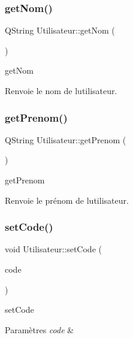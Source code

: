 \subsubsection{\texorpdfstring{get\+Nom()}{getNom()}}
{\footnotesize\ttfamily Q\+String Utilisateur\+::get\+Nom (\begin{DoxyParamCaption}{ }\end{DoxyParamCaption})}



get\+Nom 

\begin{DoxyReturn}{Renvoie}
le nom de l\textquotesingle{}utilisateur. 
\end{DoxyReturn}
\mbox{\label{class_utilisateur_a6b4d6fa5c9b5c8565c2f2d1f68df9bf3}} 
\subsubsection{\texorpdfstring{get\+Prenom()}{getPrenom()}}
{\footnotesize\ttfamily Q\+String Utilisateur\+::get\+Prenom (\begin{DoxyParamCaption}{ }\end{DoxyParamCaption})}



get\+Prenom 

\begin{DoxyReturn}{Renvoie}
le prénom de l\textquotesingle{}utilisateur. 
\end{DoxyReturn}
\mbox{\label{class_utilisateur_aba69ae1c6239270a80768ce540014a92}} 
\subsubsection{\texorpdfstring{set\+Code()}{setCode()}}
{\footnotesize\ttfamily void Utilisateur\+::set\+Code (\begin{DoxyParamCaption}\item[{Q\+String}]{code }\end{DoxyParamCaption})}



set\+Code 


\begin{DoxyParams}{Paramètres}
{\em code} & \\
\hline
\end{DoxyParams}
\mbox{\label{class_utilisateur_ad9f88d08f5bc9faed0138d92debf35fa}} 

